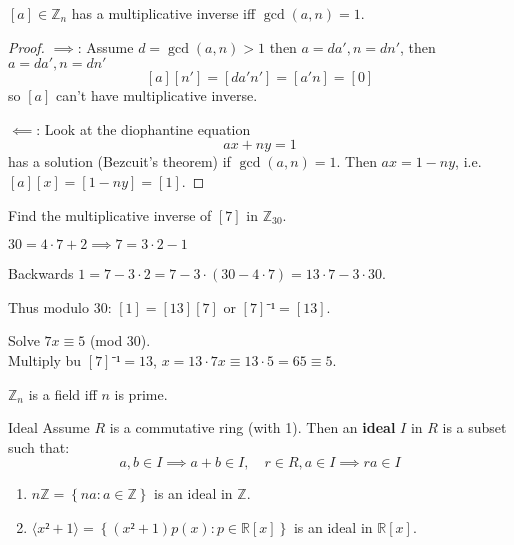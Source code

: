 \documentclass[english]{lbscript}
\begin{document}
\begin{theorem}{}{}
	\([a]∈ℤ_{n}\) has a multiplicative inverse iff \(\gcd(a, n)=1\).
\end{theorem}
\begin{proof}
	\(⟹\): Assume \(d=\gcd(a,n)>1\) then \(a=da', n=dn'\), then \(a=da', n=dn'\)
	\begin{equation}
		\label{eq:105}
		[a][n']=[da'n']=[a'n]=[0]
	\end{equation}
	so \([a]\) can't have  multiplicative inverse.

	\(\impliedby\): Look at the diophantine equation
	\begin{equation}
		\label{eq:106}
		ax+ny=1
	\end{equation}
	has a solution (Bezcuit's theorem) if \(\gcd(a,n)=1\). Then \(ax=1-ny\), i.e. \([a][x]=[1-ny]=[1]\).
\end{proof}

\begin{example}{}{}
	Find the multiplicative inverse of \([7]\) in \(ℤ_{30}\).

	\(30=4⋅7+2⟹7=3⋅2-1\)

	Backwards \(1=7-3⋅2=7- 3⋅(30-4⋅7)=13⋅7 - 3⋅30\).

	Thus modulo 30: \([1]=[13][7]\) or \([7]⁻¹=[13]\).
\end{example}
\begin{example}{}{}
	Solve \(7x≡5\) (mod 30).\\
	Multiply bu \([7]⁻¹=13\), \(x=13⋅7x≡13⋅5=65≡5\).
\end{example}

\begin{corollary}{}{}
	\(ℤ_{n}\) is a field iff \(n\) is prime.
\end{corollary}

\begin{definition}{Ideal}{}
	Assume \(R\) is a commutative ring (with 1).
	Then an \textbf{ideal} \(I\) in \(R\) is a subset such that:
	\begin{equation}
		\label{eq:107}
		a,b∈I⟹a+b∈I, \quad r∈R,a∈I⟹ra∈I
	\end{equation}
\end{definition}
\begin{example}{}{}
	\begin{enumerate}
		\item\label{item:56} \(nℤ=\left\{ na: a∈ℤ \right\} \) is an ideal in \(ℤ\).
		\item\label{item:57} \(⟨x²+1⟩=\left\{ (x²+1)p(x): p∈ℝ[x] \right\} \) is an ideal in \(ℝ[x]\).
	\end{enumerate}
\end{example}
\end{document}
